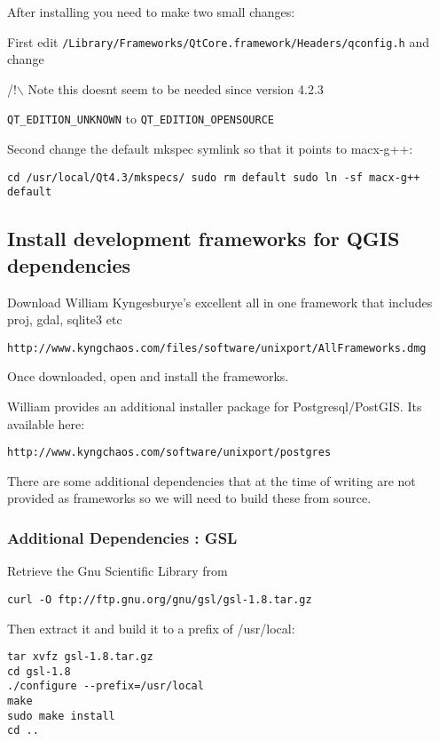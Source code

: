 After installing you need to make two small changes:

First edit \texttt{/Library/Frameworks/QtCore.framework/Headers/qconfig.h} and
change 

/!$\backslash$ Note this doesnt seem to be needed since version 4.2.3

\texttt{QT\_EDITION\_UNKNOWN} to \texttt{QT\_EDITION\_OPENSOURCE}

Second change the default mkspec symlink so that it points to macx-g++:

\begin{verbatim}
cd /usr/local/Qt4.3/mkspecs/ sudo rm default sudo ln -sf macx-g++ default
\end{verbatim}

\subsection{Install development frameworks for QGIS dependencies}
Download William Kyngesburye's excellent all in one framework that includes
proj, gdal, sqlite3 etc

\begin{verbatim}
http://www.kyngchaos.com/files/software/unixport/AllFrameworks.dmg 
\end{verbatim}

Once downloaded, open and install the frameworks.

William provides an additional installer package for Postgresql/PostGIS. Its
available here:

\begin{verbatim}
http://www.kyngchaos.com/software/unixport/postgres 
\end{verbatim}

There are some additional dependencies that at the time of writing are not
provided as frameworks so we will need to build these from source.

\subsubsection{Additional Dependencies : GSL}
Retrieve the Gnu Scientific Library from

\begin{verbatim}
curl -O ftp://ftp.gnu.org/gnu/gsl/gsl-1.8.tar.gz 
\end{verbatim}

Then extract it and build it to a prefix of /usr/local:

\begin{verbatim}
tar xvfz gsl-1.8.tar.gz 
cd gsl-1.8 
./configure --prefix=/usr/local 
make
sudo make install
cd ..  
\end{verbatim}

